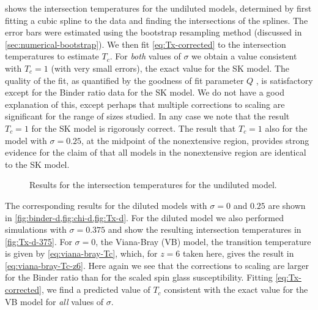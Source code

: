  shows the intersection temperatures for the undiluted models,
determined by first fitting a cubic spline to the data and finding the
intersections of the splines. The error bars were estimated using the bootstrap
resampling method (discussed in \cref{sec:numerical-bootstrap}). We then fit
\cref{eq:Tx-corrected} to the intersection temperatures to estimate $T_c$. For
\emph{both} values of $\sigma$ we obtain a value consistent with $T_c=1$ (with
very small errors), the exact value for the SK model. The quality of the fit,
as quantified by the goodness of fit parameter $Q$
\autocite{press2007numerical}, is satisfactory except for the Binder ratio data
for the SK model. We do not have a good explanation of this, except perhaps
that multiple corrections to scaling are significant for the range of sizes
studied. In any case we note that the result $T_c=1$ for the SK model is
rigorously correct. The result that $T_c=1$ also for the model with
$\sigma=0.25$, at the midpoint of the nonextensive region, provides strong
evidence for the claim of \textcite{mori2011instability} that all models in the
nonextensive region are identical to the SK model.

\begin{figure}
  \centering
  \begin{subfigure}{0.49\textwidth}
    \centering
    
  \end{subfigure}
  \begin{subfigure}{0.49\textwidth}
    \centering
    
  \end{subfigure}
  \caption[
    Results for the intersection temperatures for the one-dimensional undilted
    model with $\sigma=0$ (SK model) and $\sigma=0.25$.
  ]
  {
    Results for the intersection temperatures for the undiluted model.
  }
  \label{fig:Tx-c}
\end{figure}

The corresponding results for the diluted models with $\sigma=0$ and $0.25$ are
shown in \cref{fig:binder-d,fig:chi-d,fig:Tx-d}. For the diluted model we also
performed simulations with $\sigma=0.375$ and show the resulting intersection
temperatures in \cref{fig:Tx-d-375}. For $\sigma=0$, the Viana-Bray (VB) model,
the transition temperature is given by \cref{eq:viana-bray-Tc}, which, for
$z=6$ taken here, gives the result in \cref{eq:viana-bray-Tc-z6}. Here again we
see that the corrections to scaling are larger for the Binder ratio than for
the scaled spin glass susceptibility. Fitting \cref{eq:Tx-corrected}, we find a
predicted value of $T_c$ consistent with the exact value for the VB model for
\emph{all} values of $\sigma$.


